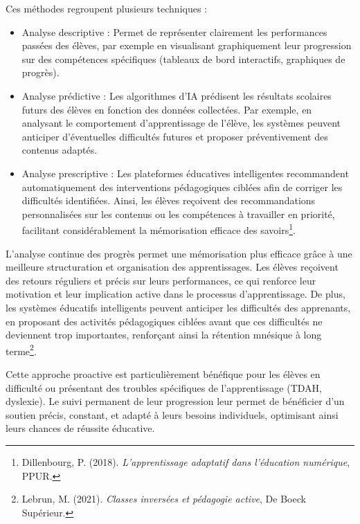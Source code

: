 \documentclass[12pt,a4paper]{report}
\begin{document}
Ces méthodes regroupent plusieurs techniques :
\begin{itemize}

    \item Analyse descriptive : Permet de représenter clairement les performances passées des élèves, par exemple en visualisant graphiquement leur progression sur des compétences spécifiques (tableaux de bord interactifs, graphiques de progrès).

    \item Analyse prédictive : Les algorithmes d’IA prédisent les résultats scolaires futurs des élèves en fonction des données collectées. Par exemple, en analysant le comportement d’apprentissage de l’élève, les systèmes peuvent anticiper d’éventuelles difficultés futures et proposer préventivement des contenus adaptés.

    \item Analyse prescriptive : Les plateformes éducatives intelligentes recommandent automatiquement des interventions pédagogiques ciblées afin de corriger les difficultés identifiées. Ainsi, les élèves reçoivent des recommandations personnalisées sur les contenus ou les compétences à travailler en priorité, facilitant considérablement la mémorisation efficace des savoirs\footnote{Dillenbourg, P. (2018). \textit{L’apprentissage adaptatif dans l’éducation numérique}, PPUR.}.

\end{itemize}

L’analyse continue des progrès permet une mémorisation plus efficace grâce à une meilleure structuration et organisation des apprentissages. Les élèves reçoivent des retours réguliers et précis sur leurs performances, ce qui renforce leur motivation et leur implication active dans le processus d’apprentissage. De plus, les systèmes éducatifs intelligents peuvent anticiper les difficultés des apprenants, en proposant des activités pédagogiques ciblées avant que ces difficultés ne deviennent trop importantes, renforçant ainsi la rétention mnésique à long terme\footnote{Lebrun, M. (2021). \textit{Classes inversées et pédagogie active}, De Boeck Supérieur.}.

Cette approche proactive est particulièrement bénéfique pour les élèves en difficulté ou présentant des troubles spécifiques de l’apprentissage (TDAH, dyslexie). Le suivi permanent de leur progression leur permet de bénéficier d’un soutien précis, constant, et adapté à leurs besoins individuels, optimisant ainsi leurs chances de réussite éducative.
\end{document}
